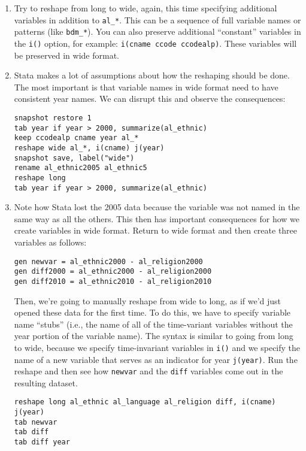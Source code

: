 \documentclass[a4paper,12pt]{article}
\begin{document}
\begin{enumerate}
\item Try to reshape from long to wide, again, this time specifying additional variables in addition to \texttt{al\_*}. This can be a sequence of full variable names or patterns (like \texttt{bdm\_*}). You can also preserve additional ``constant'' variables in the \texttt{i()} option, for example: \texttt{i(cname ccode ccodealp)}. These variables will be preserved in wide format.

\item Stata makes a lot of assumptions about how the reshaping should be done. The most important is that variable names in wide format need to have consistent year names. We can disrupt this and observe the consequences:

\begin{verbatim}
snapshot restore 1
tab year if year > 2000, summarize(al_ethnic)
keep ccodealp cname year al_*
reshape wide al_*, i(cname) j(year)
snapshot save, label("wide")
rename al_ethnic2005 al_ethnic5
reshape long
tab year if year > 2000, summarize(al_ethnic)
\end{verbatim}

\item Note how Stata lost the 2005 data because the variable was not named in the same way as all the others. This then has important consequences for how we create variables in wide format. Return to wide format and then create three variables as follows:

\begin{verbatim}
gen newvar = al_ethnic2000 - al_religion2000
gen diff2000 = al_ethnic2000 - al_religion2000
gen diff2010 = al_ethnic2010 - al_religion2010
\end{verbatim}

\noindent Then, we're going to manually reshape from wide to long, as if we'd just opened these data for the first time. To do this, we have to specify variable name ``stubs'' (i.e., the name of all of the time-variant variables without the year portion of the variable name). The syntax is similar to going from long to wide, because we specify time-invariant variables in \texttt{i()} and we specify the name of a new variable that serves as an indicator for year \texttt{j(year)}. Run the reshape and then see how \texttt{newvar} and the \texttt{diff} variables come out in the resulting dataset.

\begin{verbatim}
reshape long al_ethnic al_language al_religion diff, i(cname) j(year)
tab newvar
tab diff
tab diff year
\end{verbatim}


\end{enumerate}
\end{document}
